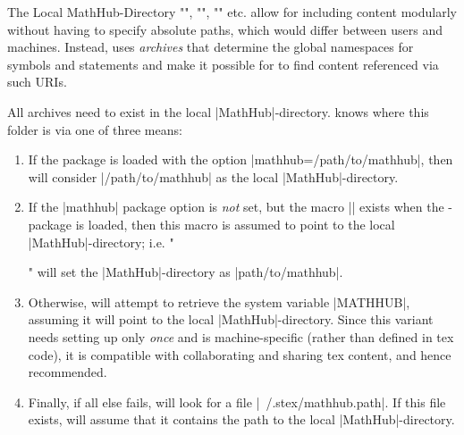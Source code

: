 \begin{sfragment}{The Local MathHub-Directory}
    \stexcode"\usemodule", \stexcode"\importmodule", 
    \stexcode"" etc. allow for 
    including content modularly without having to specify absolute
    paths, which would differ between users and machines. Instead,
    \sTeX uses \emph{archives} that determine the global
    namespaces for symbols and statements and make it possible
    for \sTeX to find content referenced via such URIs.

    All \sTeX archives need to exist in the local |MathHub|-directory.
    \sTeX knows where this folder is via one of three means:

    \begin{enumerate}
        \item If the \sTeX package is loaded with the option
            |mathhub=/path/to/mathhub|, then \sTeX will consider
            |/path/to/mathhub| as the local |MathHub|-directory.
        \item If the |mathhub| package option is \emph{not}
            set, but the macro |\mathhub| exists when the
            \sTeX-package is loaded, then this macro is
            assumed to point to the local |MathHub|-directory; i.e.
            \stexcode"\def\mathhub{/path/to/mathhub}\usepackage{stex}"
            will set the |MathHub|-directory as |path/to/mathhub|.
        \item Otherwise, \sTeX will attempt to retrieve the
            system variable |MATHHUB|, assuming it will
            point to the local |MathHub|-directory. Since this
            variant needs setting up only \emph{once} and is 
            machine-specific (rather than defined in tex code), 
            it is compatible with collaborating and sharing tex 
            content, and hence recommended.
        \item Finally, if all else fails, \sTeX will
            look for a file |~/.stex/mathhub.path|. If this
            file exists, \sTeX will assume that it contains
            the path to the local |MathHub|-directory.
    \end{enumerate}
\end{sfragment}

